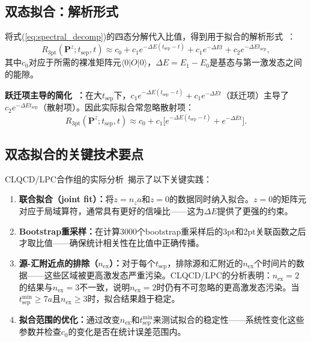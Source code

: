 \documentclass[12pt,a4paper]{ctexart}
\theoremstyle{definition}
\begin{document}
\subsection{双态拟合：解析形式}

将式(\ref{eq:spectral_decomp})的四态分解代入比值，得到用于拟合的解析形式~\cite{correlationFunctions2026}：
\begin{equation}\label{eq:two_state_fit}
    R_{3\text{pt}}(\mathbf{P}^z; t_{\text{sep}}, t) \approx
    c_0 + c_1 e^{-\Delta E(t_{\text{sep}}-t)} + c_1 e^{-\Delta E t} + c_2 e^{-\Delta E t_{\text{sep}}},
\end{equation}
其中$c_0$对应于所需的裸准矩阵元$\langle 0|O|0\rangle$，$\Delta E = E_1 - E_0$是基态与第一激发态之间的能隙。

\textbf{跃迁项主导的简化~\cite{correlationFunctions2026}：}在大$t_{\text{sep}}$下，$c_1 e^{-\Delta E(t_{\text{sep}}-t)} + c_1 e^{-\Delta E t}$（跃迁项）主导了$c_2 e^{-\Delta E t_{\text{sep}}}$（散射项）。因此实际拟合常忽略散射项：
\begin{equation}\label{eq:two_state_simple}
    R_{3\text{pt}}(\mathbf{P}^z; t_{\text{sep}}, t) \approx
    c_0 + c_1 \bigl[e^{-\Delta E(t_{\text{sep}}-t)} + e^{-\Delta E t}\bigr].
\end{equation}

\subsection{双态拟合的关键技术要点}

CLQCD/LPC合作组的实际分析~\cite{correlationFunctions2026}揭示了以下关键实践：

\begin{enumerate}[leftmargin=*]
    \item \textbf{联合拟合（joint fit）：}将$z = n_z a$和$z = 0$的数据同时纳入拟合。$z=0$的矩阵元对应于局域算符，通常具有更好的信噪比——这为$\Delta E$提供了更强的约束。

    \item \textbf{Bootstrap重采样：}在计算3000个bootstrap重采样后的3pt和2pt关联函数之后才取比值——确保统计相关性在比值中正确传播。

    \item \textbf{源-汇附近点的排除（$n_{\text{ex}}$）：}对于每个$t_{\text{sep}}$，排除源和汇附近的$n_{\text{ex}}$个时间片的数据——这些区域被更高激发态严重污染。CLQCD/LPC的分析表明：$n_{\text{ex}} = 2$的结果与$n_{\text{ex}} = 3$不一致，说明$n_{\text{ex}}=2$时仍有不可忽略的更高激发态污染。当$t_{\text{sep}}^{\min} \ge 7a$且$n_{\text{ex}} \ge 3$时，拟合结果趋于稳定。

    \item \textbf{拟合范围的优化：}通过改变$n_{\text{ex}}$和$t_{\text{sep}}^{\min}$来测试拟合的稳定性——系统性变化这些参数并检查$c_0$的变化是否在统计误差范围内。
\end{enumerate}
\end{document}

